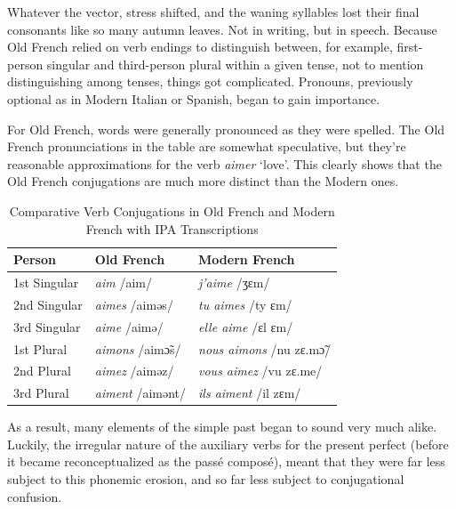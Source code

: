 Whatever the vector, stress shifted, and the waning syllables lost their final consonants like so many autumn leaves. Not in writing, but in speech. Because Old French relied on verb endings to distinguish between, for example, first-person singular and third-person plural within a given tense, not to mention distinguishing among tenses, things got complicated. Pronouns, previously optional as in Modern Italian or Spanish, began to gain importance. 

For Old French, words were generally pronounced as they were spelled. The Old French pronunciations in the table are somewhat speculative, but they're reasonable approximations for the verb \textit{aimer} `love'. This clearly shows that the Old French conjugations are much more distinct than the Modern ones. 

\begin{table}[h]
\centering
\begin{tabular}{lll}
\hline
\textbf{Person}          & \textbf{Old French} & \textbf{Modern French} \\ \hline
1st Singular             & \textit{aim} /aim/   & \textit{j'aime} /ʒɛm/           \\
2nd Singular             & \textit{aimes} /aiməs/ & \textit{tu aimes} /ty ɛm/    \\
3rd Singular             & \textit{aime} /aimə/ & \textit{elle aime} /ɛl ɛm/ \\
1st Plural               & \textit{aimons} /aimɔ̃s/ & \textit{nous aimons} /nu zɛ.mɔ̃/ \\
2nd Plural               & \textit{aimez} /aiməz/ & \textit{vous aimez} /vu zɛ.me/ \\
3rd Plural               & \textit{aiment} /aimənt/ & \textit{ils aiment} /il zɛm/ \\ \hline
\end{tabular}
\caption{Comparative Verb Conjugations in Old French and Modern French with IPA Transcriptions}
\end{table}

As a result, many elements of the simple past began to sound very much alike. Luckily, the irregular nature of the auxiliary verbs for the present perfect (before it became reconceptualized as the passé composé), meant that they were far less subject to this phonemic erosion, and so far less subject to conjugational confusion.

